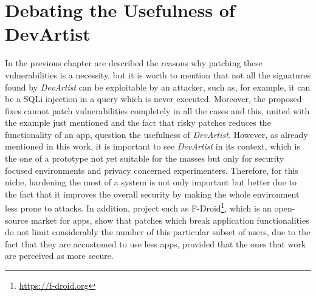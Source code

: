 \section{Debating the Usefulness of DevArtist}
In the previous chapter are described the reasons why patching these vulnerabilities is a necessity, but it is worth to mention that not all the signatures found by \emph{DevArtist} can be exploitable by an attacker, such as, for example, it can be a SQLi injection in a query which is never executed. Moreover, the proposed fixes cannot patch vulnerabilities completely in all the cases and this, united with the example just mentioned and the fact that risky patches reduces the functionality of an app, question the usefulness of \emph{DevArtist}. However, as already mentioned in this work, it is important to see \emph{DevArtist} in its context, which is the one of a prototype not yet suitable for the masses but only for security focused environments and privacy concerned experimenters. Therefore, for this niche, hardening the most of a system is not only important but better due to the fact that it improves the overall security by making the whole environment less prone to attacks. In addition, project such as F-Droid\footnote{\url{https://f-droid.org}}, which is an open-source market for apps, show that patches which break application functionalities do not limit considerably the number of this particular subset of users, due to the fact that they are accustomed to use less apps, provided that the ones that work are perceived as more secure.

 
